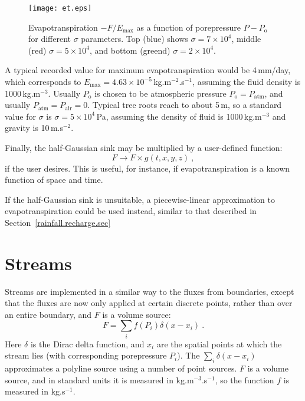 \documentclass[]{scrreprt}
\begin{document}
\begin{figure}[htb]
\centering
\texttt{[image: et.eps]}
\caption{Evapotranspiration $-F/E_{\mathrm{max}}$ as a function of
  porepressure $P - P_{\mathrm{o}}$ for different $\sigma$ parameters.  Top (blue)
  shows $\sigma=7\times 10^{4}$, middle (red) $\sigma=5\times 10^{4}$,
  and bottom (greend) $\sigma=2\times 10^{4}$.}
\label{et.fig}
\end{figure}


A typical recorded value for maximum evapotranspiration would be
4\,mm/day, which corresponds to $E_{\mathrm{max}} = 4.63\times
10^{-5}$\,kg.m$^{-2}$.s$^{-1}$, assuming the fluid density is
1000\,kg.m$^{-3}$.  Usually $P_{\mathrm{o}}$ is chosen to be atmospheric
pressure $P_{\mathrm{o}} = P_{\mathrm{atm}}$, and usually $P_{\mathrm{atm}} =
P_{\mathrm{air}} = 0$.  Typical tree roots reach to
about 5\,m, so a standard value for $\sigma$ is $\sigma = 5\times
10^{4}$\,Pa, assuming the density of fluid
is 1000\,kg.m$^{-3}$ and gravity is 10\,m.s$^{-2}$.

Finally, the half-Gaussian sink may be multiplied by a
user-defined function: 
\begin{equation}
F \rightarrow F\times g(t, x, y, z) \ ,
\end{equation}
if the user desires.  This is useful, for instance, if
evapotranspiration is a known function of space and time. 


If the half-Gaussian sink is unsuitable, a piecewise-linear
approximation to evapotranspiration could be used instead, similar to
that described in Section~\ref{rainfall.recharge.sec}


\section{Streams}

Streams are implemented in a similar way to the fluxes from
boundaries, except that the fluxes are now only
applied at certain discrete points, rather than over an entire
boundary, and $F$ is a volume source:
\begin{equation}
F = \sum_{i}f(P_{i})\delta(x - x_{i}) \ .
\label{source.stream.eqn}
\end{equation}
Here $\delta$ is the Dirac delta function, and $x_{i}$ are the spatial
points at which the stream lies (with corresponding porepressure
$P_{i}$).  The $\sum_{i}\delta(x-x_{i})$ approximates a polyline source
using a number of point sources.  $F$ is a volume source, and in
standard units it is measured in kg.m$^{-3}$.s$^{-1}$, so the function
$f$ is measured in kg.s$^{-1}$.
\end{document}
